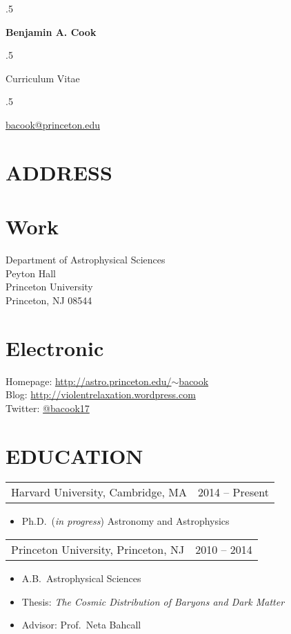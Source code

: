 \documentclass[margin]{res}
\newcommand\mancenter[1]{\moveleft.5\hoffset\centerline{#1}}
\begin{document}
  
\mancenter{\huge \bf{Benjamin A. Cook}}
\mancenter{\huge Curriculum Vitae} 
\mancenter{\large \href{mailto:bacook@princeton.edu}{bacook@princeton.edu}}


\begin{resume}                        
 
\section{ADDRESS}
\section{Work}
Department of Astrophysical Sciences\\
Peyton Hall\\
Princeton University\\ 
Princeton, NJ 08544

\section{Electronic}
Homepage: \href{http://astro.princeton.edu/~bacook}{http://astro.princeton.edu/$\sim$bacook}\\
Blog: \href{http://violentrelaxation.wordpress.com}{http://violentrelaxation.wordpress.com}\\
Twitter: \href{https://twitter.com/bacook17}{@bacook17}

\section{EDUCATION}       
\begin{tabular}{@{}p{4in} r@{}}
Harvard University, Cambridge, MA & 2014 -- Present
\end{tabular}
\begin{itemize} \itemsep -2pt
\item[] Ph.D.~(\textit{in progress}) Astronomy and Astrophysics
\end{itemize}

\begin{tabular}{@{}p{4in} r@{}}
  Princeton University, Princeton, NJ & 2010 -- 2014
\end{tabular}
\begin{itemize} \itemsep -2pt
\item[] A.B.~Astrophysical Sciences
\item[] Thesis: \textit{The Cosmic Distribution of
  Baryons and Dark Matter}
\item[] Advisor: Prof.~Neta Bahcall
\end{itemize}


\end{resume}
\end{document}
